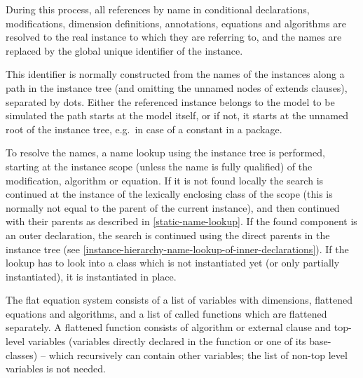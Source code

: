 During this process, all references by name in conditional declarations,
modifications, dimension definitions, annotations, equations and
algorithms are resolved to the real instance to which they are referring
to, and the names are replaced by the global unique identifier of the
instance.

\begin{nonnormative}
This identifier is normally constructed from the names of the instances along a path in the instance tree (and omitting the unnamed nodes of extends clauses), separated
by dots.  Either the referenced instance belongs to the model to be simulated the path starts at the model itself, or if not, it starts at the unnamed root of the instance
tree, e.g.\ in case of a constant in a package.
\end{nonnormative}

\begin{nonnormative}
To resolve the names, a name lookup using the instance tree is performed, starting at the instance scope (unless the name is fully qualified) of the modification, algorithm
or equation.  If it is not found locally the search is continued at the instance of the lexically enclosing class of the scope (this is normally not equal to the parent of
the current instance), and then continued with their parents as described in \cref{static-name-lookup}.  If the found component is an outer declaration, the search is
continued using the direct parents in the instance tree (see \cref{instance-hierarchy-name-lookup-of-inner-declarations}).  If the lookup has to look into a class which
is not instantiated yet (or only partially instantiated), it is instantiated in place.
\end{nonnormative}

The flat equation system consists of a list of variables with dimensions, flattened equations and algorithms, and a list of called functions which are flattened separately.  A flattened function
consists of algorithm or external clause and top-level variables (variables directly declared in the function or one of its base-classes) -- which recursively can contain other variables; the list
of non-top level variables is not needed.

